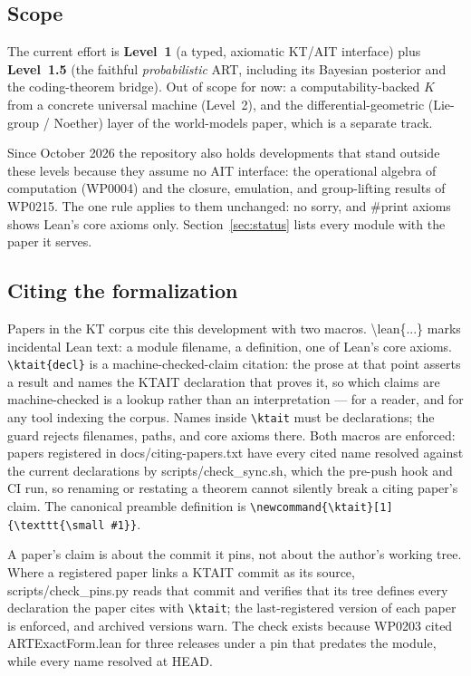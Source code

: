 \documentclass[11pt,a4paper]{article}
\newcommand{\lean}[1]{{\ttfamily\small
  \let\leanunderscore\_\def\_{\leanunderscore\allowbreak}#1}}
\newcommand{\ktait}[1]{\texttt{\small #1}}
\begin{document}
\subsection{Scope}
The current effort is \textbf{Level~1} (a typed, axiomatic KT/AIT interface) plus
\textbf{Level~1.5} (the faithful \emph{probabilistic} ART, including its Bayesian posterior and
the coding-theorem bridge). Out of scope for now: a computability-backed $K$ from a concrete
universal machine (Level~2), and the differential-geometric (Lie-group / Noether) layer of the
world-models paper,\cite{ruffini2025worldmodels} which is a separate track.

Since October 2026 the repository also holds developments that stand outside these levels
because they assume no AIT interface: the operational algebra of computation (WP0004) and the
closure, emulation, and group-lifting results of WP0215. The one rule applies to them unchanged:
no \lean{sorry}, and \lean{\#print axioms} shows Lean's core axioms only.
Section~\ref{sec:status} lists every module with the paper it serves.

\subsection{Citing the formalization}
\label{sec:citing}
Papers in the KT corpus cite this development with two macros. \lean{\textbackslash lean\{...\}}
marks incidental Lean text: a module filename, a definition, one of Lean's core axioms.
\ktait{\textbackslash ktait\{decl\}} is a machine-checked-claim citation: the prose at that
point asserts a result and names the KTAIT declaration that proves it, so which claims are
machine-checked is a lookup rather than an interpretation --- for a reader, and for any tool
indexing the corpus. Names inside \ktait{\textbackslash ktait} must be declarations; the guard
rejects filenames, paths, and core axioms there. Both macros are enforced: papers registered
in \lean{docs/citing-papers.txt} have every cited name resolved against the current
declarations by \lean{scripts/check\_sync.sh}, which the pre-push hook and CI run, so renaming
or restating a theorem cannot silently break a citing paper's claim. The canonical preamble
definition is \verb|\newcommand{\ktait}[1]{\texttt{\small #1}}|.

A paper's claim is about the commit it pins, not about the author's working tree. Where a
registered paper links a KTAIT commit as its source, \lean{scripts/check\_pins.py} reads that
commit and verifies that its tree defines every declaration the paper cites with
\ktait{\textbackslash ktait}; the last-registered version of each paper is enforced, and
archived versions warn. The check exists because WP0203 cited \lean{ARTExactForm.lean} for
three releases under a pin that predates the module, while every name resolved at HEAD.
\end{document}
